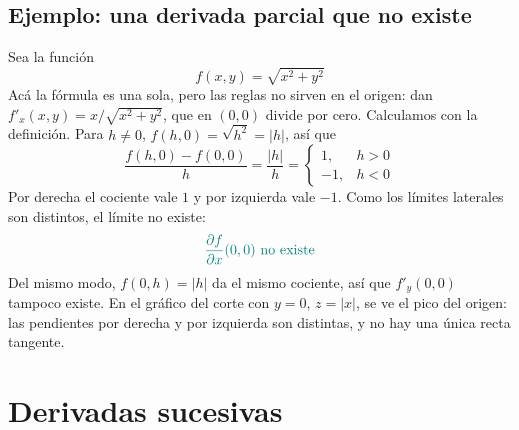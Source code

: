 \documentclass{article}
\begin{document}
\subsection*{Ejemplo: una derivada parcial que no existe}

Sea la función
\[
f(x,y)=\sqrt{x^{2}+y^{2}}
\]
Acá la fórmula es una sola, pero las reglas no sirven en el origen: dan \(f'_x(x,y)=x/\sqrt{x^{2}+y^{2}}\), que en \((0,0)\) divide por cero. Calculamos con la definición. Para \(h\neq0\), \(f(h,0)=\sqrt{h^{2}}=|h|\), así que
\[
\frac{f(h,0)-f(0,0)}{h}=\frac{|h|}{h}=
\begin{cases}
1, & h>0\\
-1, & h<0
\end{cases}
\]
Por derecha el cociente vale \(1\) y por izquierda vale \(-1\). Como los límites laterales son distintos, el límite no existe:
\[
\color{teal}
\frac{\partial f}{\partial x}(0,0)\ \text{no existe}
\]
Del mismo modo, \(f(0,h)=|h|\) da el mismo cociente, así que \(f'_y(0,0)\) tampoco existe.
En el gráfico del corte con \(y=0\), \(z=|x|\), se ve el pico del origen: las pendientes por derecha y por izquierda son distintas, y no hay una única recta tangente.
\begin{center}
\end{center}


\section*{Derivadas sucesivas}
\end{document}
